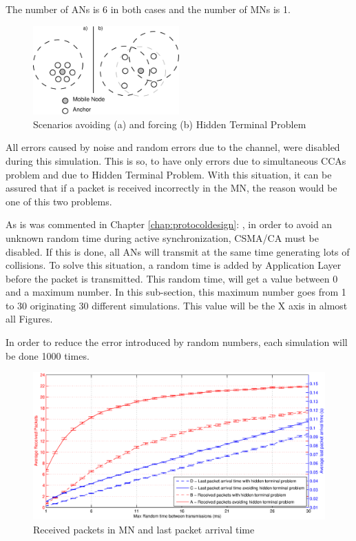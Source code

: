 The number of \acp{AN} is 6 in both cases and the number of \acp{MN} is 1.

\begin{figure}[ht]
 \begin{center}
  \includegraphics[width=0.5\textwidth]{hiddenvsnohidden.eps}
 \end{center}
 \caption{Scenarios avoiding (a) and forcing (b) Hidden Terminal Problem}
 \label{fig:hiddenvsnohidden}
\end{figure}

All errors caused by noise and random errors due to the channel, were disabled during this simulation. This is so, to have only errors due to 
simultaneous \acp{CCA} problem and due to Hidden Terminal Problem. With this situation, it can be assured that if a packet is received 
incorrectly in the \ac{MN}, the reason would be one of this two problems.

As is was commented in Chapter \ref{chap:protocoldesign}: , in order to avoid an unknown random time during active 
synchronization, \ac{CSMA/CA} must be disabled. If this is done, all \acp{AN} will transmit at the same time generating lots of collisions. 
To solve this situation, a random time is added by Application Layer before the packet is transmitted. This random time, will get a value
between 0 and a maximum number. In this sub-section, this maximum number goes from 1 to 30 originating 30 different simulations. This value will 
be the X axis in almost all Figures. 

In order to reduce the error introduced by random numbers, each simulation will be done 1000 times.

\begin{figure}[ht]
 \begin{center}
  \includegraphics[width=1\textwidth]{receivedPacketsAndLastPacketArrival.eps}
 \end{center}
 \caption{Received packets in \ac{MN} and last packet arrival time}
 \label{fig:receivedPacketsAndLastPacketArrival}
\end{figure}


